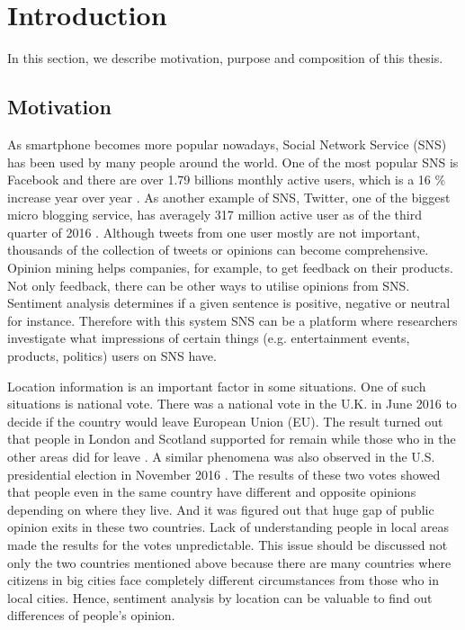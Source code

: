 \chapter{Introduction}
In this section, we describe motivation, purpose and composition of this thesis.

\section{Motivation} \label{sec:motivation}
As smartphone becomes more popular nowadays, Social Network Service (SNS) has been used by many people around the world.
One of the most popular SNS is Facebook and there are over 1.79 billions monthly active users, which is a 16 \% increase year over year \cite{facebook_user}.
As another example of SNS, Twitter, one of the biggest micro blogging service, has averagely 317 million active user as of the third quarter of 2016 \cite{twitter_user}.
Although tweets from one user mostly are not important, thousands of the collection of tweets or opinions can become comprehensive.
Opinion mining helps companies, for example, to get feedback on their products.
Not only feedback, there can be other ways to utilise opinions from SNS.
Sentiment analysis determines if a given sentence is positive, negative or neutral for instance.
Therefore with this system SNS can be a platform where researchers investigate what impressions of certain things (e.g. entertainment events, products, politics) users on SNS have.


Location information is an important factor in some situations.
One of such situations is national vote.
There was a national vote in the U.K. in June 2016 to decide if the country would leave European Union (EU).
The result turned out that people in London and Scotland supported for remain while those who in the other areas did for leave \cite{uk_referendum}.
A similar phenomena was also observed in the U.S. presidential election in November 2016 \cite{us_map}.
The results of these two votes showed that people even in the same country have different and opposite opinions depending on where they live.
And it was figured out that huge gap of public opinion exits in these two countries.
Lack of understanding people in local areas made the results for the votes unpredictable.
This issue should be discussed not only the two countries mentioned above because there are many countries where citizens in big cities face completely different circumstances from those who in local cities.
Hence, sentiment analysis by location can be valuable to find out differences of people's opinion. 

